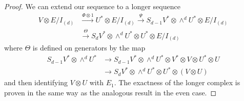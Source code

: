 \documentclass{tran-l}
\theoremstyle{plain}
\theoremstyle{remark}
\theoremstyle{definition}
\begin{document}
\begin{proof}
We can extend our sequence to a longer sequence
\begin{align*}
V\otimes E/I_{(d)} &{\overset{{\Phi \otimes 1}}{\longrightarrow }} 
U^{*}\otimes E/I_{(d)} {\overset{\Psi }{\longrightarrow }}S_{d-1}V^{*}\otimes
\wedge ^{d} 
U^{*}\otimes E/I_{(d)} \\
&{\overset{\Theta }{\longrightarrow }}S_{d}V^{*}\otimes
\wedge ^{d} U^{*}\otimes U^{*}\otimes E/I_{(d)}\end{align*} 
where $\Theta $ is defined on generators by the map 
\begin{align*}S_{d-1}V^{*}\otimes \wedge ^{d} U^{*}&\rightarrow
S_{d-1}V^{*}\otimes \wedge ^{d} U^{*}\otimes V^{*}\otimes V\otimes U^{*}\otimes
U\\
&\rightarrow S_{d} V^{*}\otimes \wedge ^{d} U^{*}\otimes U^{*}\otimes (V\otimes
U)\end{align*} 
and then identifying $V\otimes U$ with $E_{1}$. 
The exactness of the longer complex
is proven in the same way as the analogous 
result in the even case.\end{proof}
\end{document}
